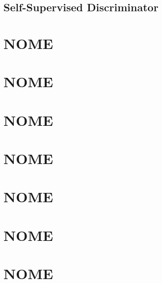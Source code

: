 \documentclass[12pt]{article}
\begin{document}
\subsection{Self-Supervised Discriminator}


\section{NOME}
\large



\section{NOME}
\large



\section{NOME}
\large



\section{NOME}
\large



\section{NOME}
\large



\section{NOME}
\large



\section{NOME}
\large
\end{document}
